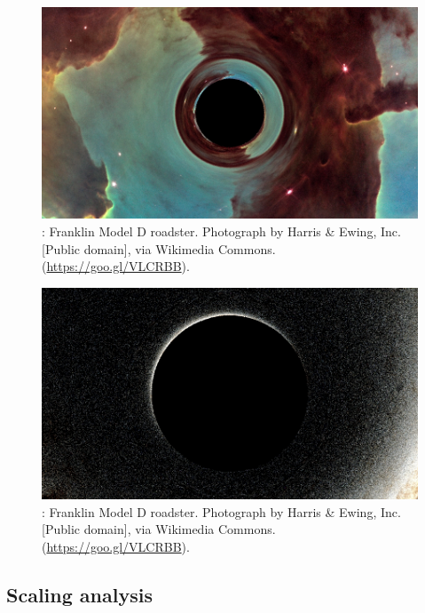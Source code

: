 \begin{figure}[h]
  \centering
  \includegraphics[width=\linewidth]{eagle_render}
  \caption{: Franklin Model D roadster. Photograph by Harris \&
    Ewing, Inc. [Public domain], via Wikimedia
    Commons. (\url{https://goo.gl/VLCRBB}).}
    \label{fig:eagle}
\end{figure}

\begin{figure}[h]
  \centering
  \includegraphics[width=\linewidth]{starry_render}
  \caption{: Franklin Model D roadster. Photograph by Harris \&
    Ewing, Inc. [Public domain], via Wikimedia
    Commons. (\url{https://goo.gl/VLCRBB}).}
    \label{fig:starry}
\end{figure}

\subsection {Scaling analysis}

